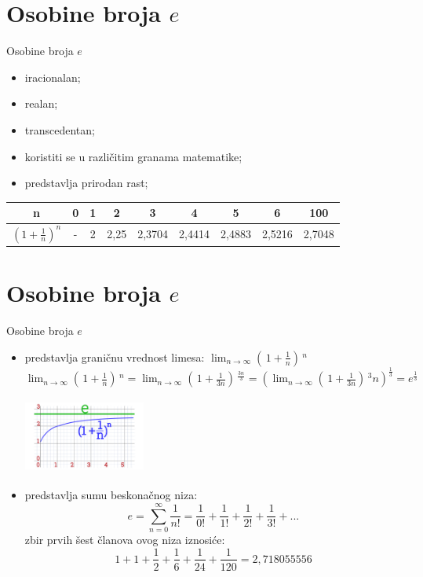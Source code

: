 \documentclass[xcolor=dvipsnames]{beamer}
\begin{document}
\section{Osobine broja $e$}
\begin{frame}
\begin{block}{Osobine broja $e$}
    \begin{itemize}
        \item iracionalan;
        \item realan;
        \item transcedentan;
        \item koristiti se u različitim granama matematike;
        \item predstavlja prirodan rast;
    \end{itemize}
    \begin{center}

		\begin{tabular}{|c|c|c|c|c|c|c|c|c|}
			\hline 
			n & 0 & 1 & 2 & 3 & 4 & 5 & 6 & 100 \\
			\hline
			$( 1 + \frac{1}{n} )^n$ & - & 2 & 2,25 & 2,3704 & 2,4414 & 2,4883 & 2,5216 & 2,7048 \\
			\hline
   
		\end{tabular}
	\end{center}
\end{block}   
\end{frame}

\section{Osobine broja $e$}
\begin{frame}
\begin{block}{Osobine broja $e$}
    \begin{itemize}
        \item predstavlja graničnu vrednost limesa: $\lim_{n\to\infty} ( \, 1 + \frac{1}{n} 	) \,^n$
        $\lim_{n\to\infty} ( \, 1 + \frac{1}{n} 	) \,^n =\lim_{n\to\infty} ( \, 1 + \frac{1}{3n} ) \,^\frac{3n}{3}= (\lim_{n\to\infty} ( \, 1 + \frac{1}{3n} ) \,^3n)^\frac{1}{3}= e^\frac{1}{3}$

	\includegraphics[height = 2.5cm, width = 4cm]{grafikon.jpg}
    \end{itemize}
    \begin{itemize}
        \item predstavlja sumu beskonačnog niza: \[ e= \sum_{n=0}^{\infty} \frac{1}{n!} = \frac{1}{0!} + \frac{1}{1!} + \frac{1}{2!} + \frac{1}{3!} + ... \]
        zbir prvih šest članova ovog niza iznosiće: \[ 1 + 1 + \frac{1}{2} + \frac{1}{6} + \frac{1}{24} + \frac{1}{120} = 2,718055556 \]
    \end{itemize}
\end{block}
\end{frame}
\end{document}
